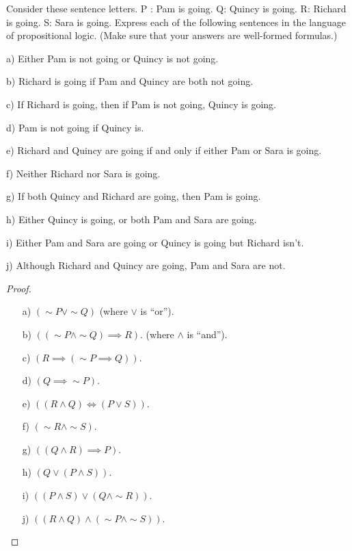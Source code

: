 \documentclass{article}
\begin{document}
\newpage

\begin{ques}\label{q10}
Consider these sentence letters. P : Pam is going. Q: Quincy
is going. R: Richard is going. S: Sara is going. Express each of the following
sentences in the language of propositional logic. (Make sure that your answers
are well-formed formulas.)

a) Either Pam is not going or Quincy is not going.

b) Richard is going if Pam and Quincy are both not going.

c) If Richard is going, then if Pam is not going, Quincy is going.

d) Pam is not going if Quincy is.

e) Richard and Quincy are going if and only if either Pam or Sara is going.

f) Neither Richard nor Sara is going.

g) If both Quincy and Richard are going, then Pam is going.

h) Either Quincy is going, or both Pam and Sara are going.

i) Either Pam and Sara are going or Quincy is going but Richard isn’t.

j) Although Richard and Quincy are going, Pam and Sara are not.
\end{ques}

\begin{proof}

    \hfil

    \begin{itemize}
        \item[a)] $(\sim P \vee \sim Q)$ (where $\vee$ is ``or'').
        \item[b)] $((\sim P \wedge \sim Q)\implies R)$. (where $\wedge$ is ``and'').
        \item[c)] $(R \implies (\sim P \implies Q))$.
        \item[d)] $(Q \implies \sim P)$.
        \item[e)] $((R \wedge Q)\iff (P \vee S))$.
        \item[f)] $(\sim R\wedge \sim S)$.
        \item[g)] $((Q \wedge R)\implies P)$.
        \item[h)] $(Q \vee (P \wedge S))$.
        \item[i)] $((P \wedge S) \vee (Q \wedge \sim R))$.
        \item[j)] $((R \wedge Q) \wedge (\sim P \wedge \sim S))$.
    \end{itemize}
\end{proof}
\end{document}
